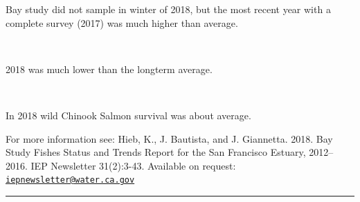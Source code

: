\documentclass[
]{book}
\begin{document}
\begin{panel-grid}
\begin{columns-nocenter}
\begin{column800}
\begin{expand}
\end{expand}

\end{column800}

\end{columns-nocenter}

\begin{columns-nocenter}

\begin{column800}

Bay study did not sample in winter of 2018, but the most recent year with a complete survey (2017) was much higher than average.

\end{column800}

\begin{column40}

~

\end{column40}

\begin{column800}

2018 was much lower than the longterm average.

\end{column800}

\begin{column40}

~

\end{column40}

\begin{column800}

In 2018 wild Chinook Salmon survival was about average.

\end{column800}

\end{columns-nocenter}

\end{panel-grid}

\begin{disclaimer}
For more information see: Hieb, K., J. Bautista, and J. Giannetta. 2018.
Bay Study Fishes Status and Trends Report for the San Francisco Estuary,
2012--2016. IEP Newsletter 31(2):3-43. Available on request:
\href{mailto:iepnewsletter@water.ca.gov}{\nolinkurl{iepnewsletter@water.ca.gov}}
\end{disclaimer}

\begin{center}\rule{0.5\linewidth}{0.5pt}\end{center}
\end{document}
